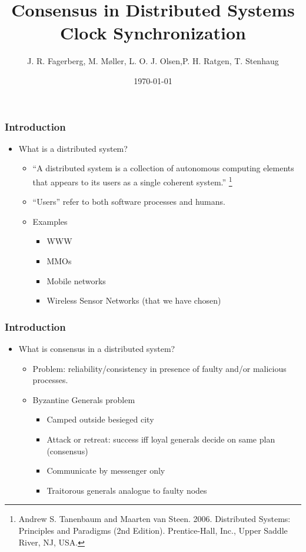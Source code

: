 \documentclass{beamer}
\title{Consensus in Distributed Systems \\ Clock Synchronization}
\author{J. R. Fagerberg, M. Møller, L. O. J. Olsen,\newline P. H. Ratgen, T. Stenhaug}
\institute{IMADA}
\date{\today}
\begin{document}
 
\frame{\titlepage}
 
\begin{frame}
  \frametitle{Introduction}
  \begin{itemize}
  \item<1-> What is a distributed system?
    \begin{itemize}
    \item<2-> ``A distributed system is a collection of autonomous
      computing elements that appears to its users as a single
      coherent system.'' \footnote{Andrew S. Tanenbaum and Maarten van
        Steen. 2006. Distributed Systems: Principles and Paradigms
        (2nd Edition). Prentice-Hall, Inc., Upper Saddle River, NJ,
        USA.}
    \item<3-> ``Users'' refer to both software processes and humans.
    \item<4-> Examples
      \begin{itemize}
      \item<5-> WWW
      \item<6-> MMOs
      \item<7-> Mobile networks
      \item<8-> Wireless Sensor Networks (that we have chosen)
      \end{itemize}
    \end{itemize}
  \end{itemize}
\end{frame}

\begin{frame}
  \frametitle{Introduction}
  \begin{itemize}
  \item<1-> What is consensus in a distributed system?
    \begin{itemize}
    \item<2-> Problem: reliability/consistency in presence of faulty
      and/or malicious processes.
    \item<3-> Byzantine Generals problem
      \begin{itemize}
      \item<4-> Camped outside besieged city
      \item<5-> Attack or retreat: success iff loyal generals decide on same plan (consensus)
      \item<6-> Communicate by messenger only
      \item<7-> Traitorous generals analogue to faulty nodes
      \end{itemize}
    \end{itemize}
  \end{itemize}
\end{frame}
\end{document}
